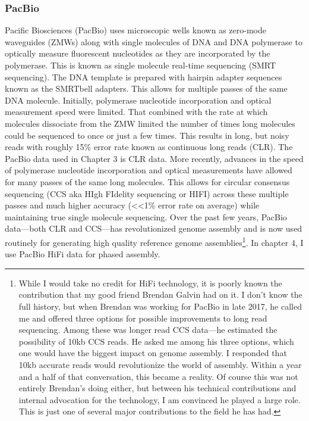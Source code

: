 \subsubsection{PacBio}

\par{
Pacific Biosciences (PacBio) uses microscopic wells known as zero-mode waveguides (ZMWs) along with single molecules of DNA and DNA polymerase to optically measure fluorescent nucleotides as they are incorporated by the polymerase. This is known as single molecule real-time sequencing (SMRT sequencing). The DNA template is prepared with hairpin adapter sequences known as the SMRTbell adapters. This allows for multiple passes of the same DNA molecule. Initially, polymerase nucleotide incorporation and optical measurement speed were limited. That combined with the rate at which molecules dissociate from the ZMW limited the number of times long molecules could be sequenced to once or just a few times. This results in long, but noisy reads with roughly 15\% error rate\cite{pacbio}\cite{blasr}\cite{clrerror} known as continuous long reads (CLR). The PacBio data used in Chapter 3 is CLR data. More recently, advances in the speed of polymerase nucleotide incorporation and optical measurements have allowed for many passes of the same long molecules. This allows for circular consensus sequencing (CCS aka HIgh FIdelity sequencing or HIFI) across these multiple passes and much higher accuracy (<<1\% error rate on average) while maintaining true single molecule sequencing\cite{HIFI}. Over the past few years, PacBio data---both CLR and CCS---has revolutionized genome assembly and is now used routinely for generating high quality reference genome assemblies\footnote{While I would take no credit for HiFi technology, it is poorly known the contribution that my good friend Brendan Galvin had on it. I don't know the full history, but when Brendan was working for PacBio in late 2017, he called me and offered three options for possible improvements to long read sequencing. Among these was longer read CCS data---he estimated the possibility of 10kb CCS reads. He asked me among his three options, which one would have the biggest impact on genome assembly. I responded that 10kb accurate reads would revolutionize the world of assembly. Within a year and a half of that conversation, this became a reality. Of course this was not entirely Brendan's doing either, but between his technical contributions and internal advocation for the technology, I am convinced he played a large role. This is just one of several major contributions to the field he has had.}. In chapter 4, I use PacBio HiFi data for phased assembly.
}

